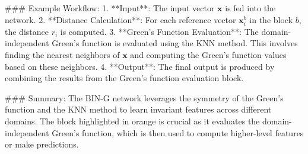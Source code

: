 ### Example Workflow:
1. **Input**: The input vector \(\mathbf{x}\) is fed into the network.
2. **Distance Calculation**: For each reference vector \(\mathbf{x}_i^b\) in the block \(b\), the distance \(r_i\) is computed.
3. **Green's Function Evaluation**: The domain-independent Green's function is evaluated using the KNN method. This involves finding the nearest neighbors of \(\mathbf{x}\) and computing the Green's function values based on these neighbors.
4. **Output**: The final output is produced by combining the results from the Green's function evaluation block.

### Summary:
The BIN-G network leverages the symmetry of the Green's function and the KNN method to learn invariant features across different domains. The block highlighted in orange is crucial as it evaluates the domain-independent Green's function, which is then used to compute higher-level features or make predictions.